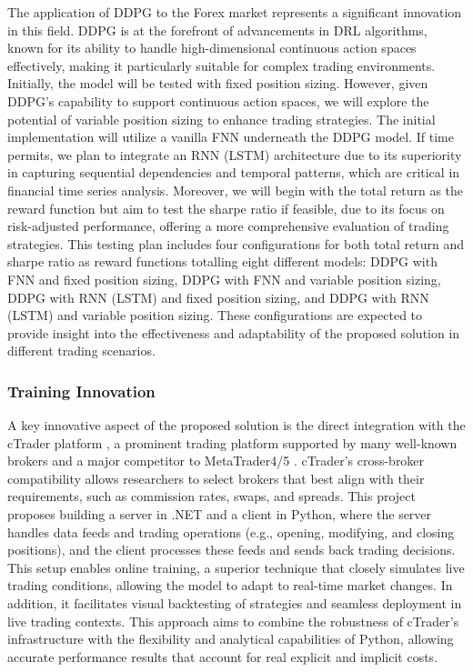 The application of DDPG to the Forex market represents a significant innovation in this field. DDPG is at the forefront of advancements in DRL algorithms, known for its ability to handle high-dimensional continuous action spaces effectively, making it particularly suitable for complex trading environments. Initially, the model will be tested with fixed position sizing. However, given DDPG's capability to support continuous action spaces, we will explore the potential of variable position sizing to enhance trading strategies. The initial implementation will utilize a vanilla FNN underneath the DDPG model. If time permits, we plan to integrate an RNN (LSTM) architecture due to its superiority in capturing sequential dependencies and temporal patterns, which are critical in financial time series analysis. Moreover, we will begin with the total return as the reward function but aim to test the sharpe ratio if feasible, due to its focus on risk-adjusted performance, offering a more comprehensive evaluation of trading strategies. This testing plan includes four configurations for both total return and sharpe ratio as reward functions totalling eight different models: DDPG with FNN and fixed position sizing, DDPG with FNN and variable position sizing, DDPG with RNN (LSTM) and fixed position sizing, and DDPG with RNN (LSTM) and variable position sizing. These configurations are expected to provide insight into the effectiveness and adaptability of the proposed solution in different trading scenarios.

\subsubsection{Training Innovation}

A key innovative aspect of the proposed solution is the direct integration with the cTrader platform \cite{noauthor_forex_nodate}, a prominent trading platform supported by many well-known brokers and a major competitor to MetaTrader4/5 \cite{noauthor_metatrader_nodate}. cTrader’s cross-broker compatibility allows researchers to select brokers that best align with their requirements, such as commission rates, swaps, and spreads. This project proposes building a server in .NET and a client in Python, where the server handles data feeds and trading operations (e.g., opening, modifying, and closing positions), and the client processes these feeds and sends back trading decisions. This setup enables online training, a superior technique that closely simulates live trading conditions, allowing the model to adapt to real-time market changes. In addition, it facilitates visual backtesting of strategies and seamless deployment in live trading contexts. This approach aims to combine the robustness of cTrader’s infrastructure with the flexibility and analytical capabilities of Python, allowing accurate performance results that account for real explicit and implicit costs.

